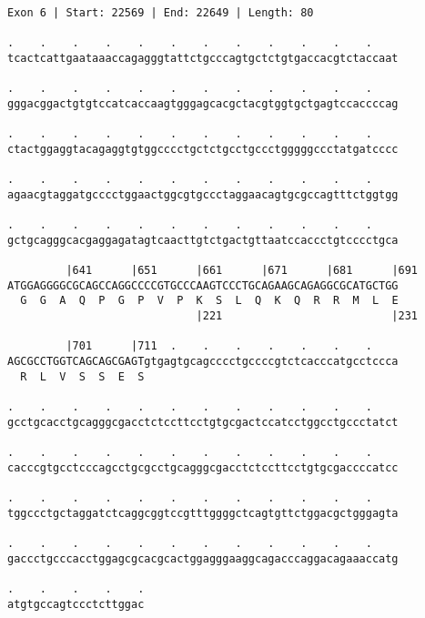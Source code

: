 \documentclass{article}
\begin{document}
\newpage
\begin{Verbatim}
Exon 6 | Start: 22569 | End: 22649 | Length: 80
 
.    .    .    .    .    .    .    .    .    .    .    .    
tcactcattgaataaaccagagggtattctgcccagtgctctgtgaccacgtctaccaat
  
.    .    .    .    .    .    .    .    .    .    .    .    
gggacggactgtgtccatcaccaagtgggagcacgctacgtggtgctgagtccaccccag
  
.    .    .    .    .    .    .    .    .    .    .    .    
ctactggaggtacagaggtgtggcccctgctctgcctgccctgggggccctatgatcccc
  
.    .    .    .    .    .    .    .    .    .    .    .    
agaacgtaggatgcccctggaactggcgtgccctaggaacagtgcgccagtttctggtgg
  
.    .    .    .    .    .    .    .    .    .    .    .    
gctgcagggcacgaggagatagtcaacttgtctgactgttaatccaccctgtcccctgca
  
         |641      |651      |661      |671      |681      |691
ATGGAGGGGCGCAGCCAGGCCCCGTGCCCAAGTCCCTGCAGAAGCAGAGGCGCATGCTGG
  G  G  A  Q  P  G  P  V  P  K  S  L  Q  K  Q  R  R  M  L  E
                             |221                          |231
  
         |701      |711  .    .    .    .    .    .    .    
AGCGCCTGGTCAGCAGCGAGTgtgagtgcagcccctgccccgtctcacccatgcctccca
  R  L  V  S  S  E  S                                       
  
.    .    .    .    .    .    .    .    .    .    .    .    
gcctgcacctgcagggcgacctctccttcctgtgcgactccatcctggcctgccctatct
  
.    .    .    .    .    .    .    .    .    .    .    .    
cacccgtgcctcccagcctgcgcctgcagggcgacctctccttcctgtgcgaccccatcc
  
.    .    .    .    .    .    .    .    .    .    .    .    
tggccctgctaggatctcaggcggtccgtttggggctcagtgttctggacgctgggagta
  
.    .    .    .    .    .    .    .    .    .    .    .    
gaccctgcccacctggagcgcacgcactggagggaaggcagacccaggacagaaaccatg
  
.    .    .    .    .
atgtgccagtccctcttggac
\end{Verbatim}
\newpage
\end{document}
